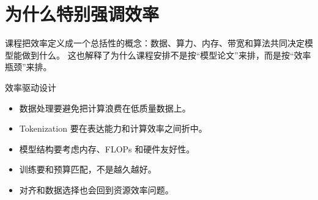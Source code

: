 \section{为什么特别强调效率}

课程把效率定义成一个总括性的概念：数据、算力、内存、带宽和算法共同决定模型能做到什么。
这也解释了为什么课程安排不是按“模型论文”来排，而是按“效率瓶颈”来排。

\begin{importantbox}{效率驱动设计}
\begin{itemize}
    \item 数据处理要避免把计算浪费在低质量数据上。
    \item Tokenization 要在表达能力和计算效率之间折中。
    \item 模型结构要考虑内存、FLOPs 和硬件友好性。
    \item 训练要和预算匹配，不是越久越好。
    \item 对齐和数据选择也会回到资源效率问题。
\end{itemize}
\end{importantbox}

